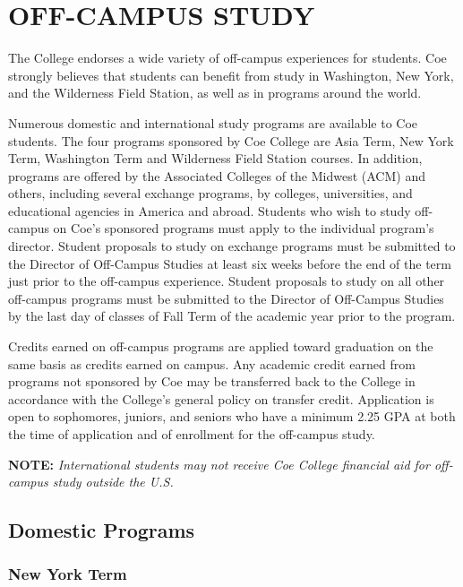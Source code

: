 \documentclass[
  letterpaper,
]{scrbook}
\begin{document}
\chapter{OFF-CAMPUS STUDY}\label{off-campus-study}

The College endorses a wide variety of off-campus experiences for
students. Coe strongly believes that students can benefit from study in
Washington, New York, and the Wilderness Field Station, as well as in
programs around the world.

Numerous domestic and international study programs are available to Coe
students. The four programs sponsored by Coe College are Asia Term, New
York Term, Washington Term and Wilderness Field Station courses. In
addition, programs are offered by the Associated Colleges of the Midwest
(ACM) and others, including several exchange programs, by colleges,
universities, and educational agencies in America and abroad. Students
who wish to study off-campus on Coe's sponsored programs must apply to
the individual program's director. Student proposals to study on
exchange programs must be submitted to the Director of Off-Campus
Studies at least six weeks before the end of the term just prior to the
off-campus experience. Student proposals to study on all other
off-campus programs must be submitted to the Director of Off-Campus
Studies by the last day of classes of Fall Term of the academic year
prior to the program.

Credits earned on off-campus programs are applied toward graduation on
the same basis as credits earned on campus. Any academic credit earned
from programs not sponsored by Coe may be transferred back to the
College in accordance with the College's general policy on transfer
credit. Application is open to sophomores, juniors, and seniors who have
a minimum 2.25 GPA at both the time of application and of enrollment for
the off-campus study.

\textbf{NOTE:} \emph{International students may not receive Coe College
financial aid for off-campus study outside the U.S.}

\section{Domestic Programs}\label{domestic-programs}

\subsection{New York Term}\label{new-york-term}
\end{document}
